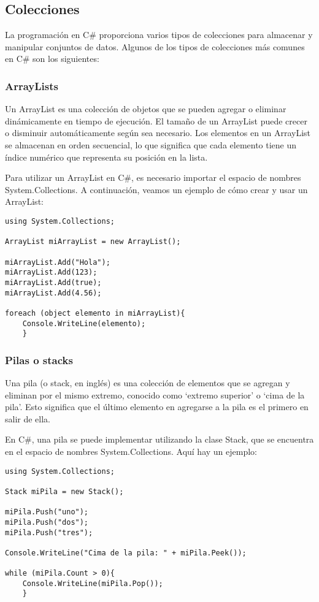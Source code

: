 \documentclass[executivepaper]{article}
\begin{document}
\subsection{Colecciones}

La programación en C\# proporciona varios tipos de colecciones para almacenar y manipular conjuntos de datos. Algunos de los tipos de colecciones más comunes en C\# son los siguientes:

\subsubsection*{ArrayLists}
Un ArrayList es una colección de objetos que se pueden agregar o eliminar dinámicamente en tiempo de ejecución. El tamaño de un ArrayList puede crecer o disminuir automáticamente según sea necesario. Los elementos en un ArrayList se almacenan en orden secuencial, lo que significa que cada elemento tiene un índice numérico que representa su posición en la lista.

Para utilizar un ArrayList en C\#, es necesario importar el espacio de nombres System.Collections. A continuación, veamos un ejemplo de cómo crear y usar un ArrayList:

\begin{lstlisting}
using System.Collections;

ArrayList miArrayList = new ArrayList();

miArrayList.Add("Hola");
miArrayList.Add(123);
miArrayList.Add(true);
miArrayList.Add(4.56);

foreach (object elemento in miArrayList){
    Console.WriteLine(elemento);
    }
\end{lstlisting}

\subsubsection*{Pilas o stacks}
Una pila (o stack, en inglés) es una colección de elementos que se agregan y eliminan por el mismo extremo, conocido como \enquote*{extremo superior} o \enquote*{cima de la pila}. Esto significa que el último elemento en agregarse a la pila es el primero en salir de ella.

En C\#, una pila se puede implementar utilizando la clase Stack, que se encuentra en el espacio de nombres System.Collections. Aquí hay un ejemplo:

\begin{lstlisting}
using System.Collections;

Stack miPila = new Stack();

miPila.Push("uno");
miPila.Push("dos");
miPila.Push("tres");

Console.WriteLine("Cima de la pila: " + miPila.Peek());

while (miPila.Count > 0){
    Console.WriteLine(miPila.Pop());
    }
\end{lstlisting}
\end{document}
